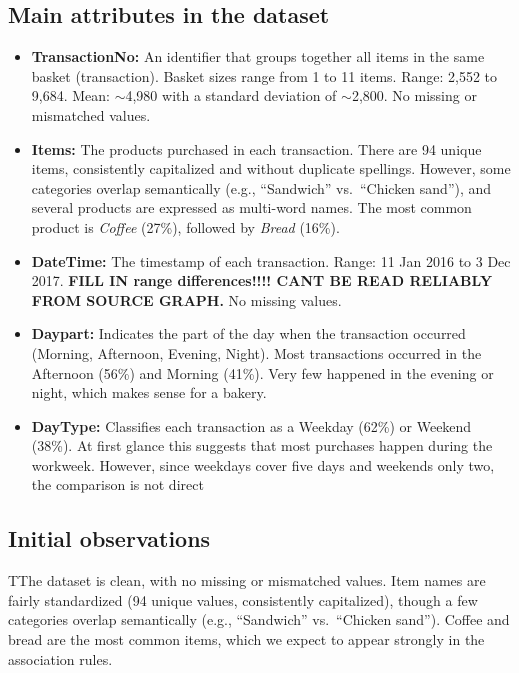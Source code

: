 \subsection*{Main attributes in the dataset}
\begin{itemize}
    \item \textbf{TransactionNo:} An identifier that groups together all items in the same basket (transaction).  
    Basket sizes range from 1 to 11 items.  
    Range: 2,552 to 9,684.  
    Mean: $\sim$4,980 with a standard deviation of $\sim$2,800.  
    No missing or mismatched values.  

    \item \textbf{Items:} The products purchased in each transaction.  
There are 94 unique items, consistently capitalized and without duplicate spellings.  
However, some categories overlap semantically (e.g., ``Sandwich'' vs.\ ``Chicken sand''), 
and several products are expressed as multi-word names.  
The most common product is \textit{Coffee} (27\%), followed by \textit{Bread} (16\%).  

    \item \textbf{DateTime:} The timestamp of each transaction.  
    Range: 11 Jan 2016 to 3 Dec 2017.  
    \textbf{FILL IN range differences!!!! CANT BE READ RELIABLY FROM SOURCE GRAPH.}
    No missing values.  

    \item \textbf{Daypart:} Indicates the part of the day when the transaction occurred (Morning, Afternoon, Evening, Night).  
    Most transactions occurred in the Afternoon (56\%) and Morning (41\%).  
    Very few happened in the evening or night, which makes sense for a bakery.  

    \item \textbf{DayType:} Classifies each transaction as a Weekday (62\%) or Weekend (38\%).  
    At first glance this suggests that most purchases happen during the workweek. 
    However, since weekdays cover five days and weekends only two, the comparison is not direct

\end{itemize}

\subsection*{Initial observations}
TThe dataset is clean, with no missing or mismatched values.  
Item names are fairly standardized (94 unique values, consistently capitalized), 
though a few categories overlap semantically (e.g., ``Sandwich'' vs.\ ``Chicken sand'').  
Coffee and bread are the most common items, 
which we expect to appear strongly in the association rules.  

